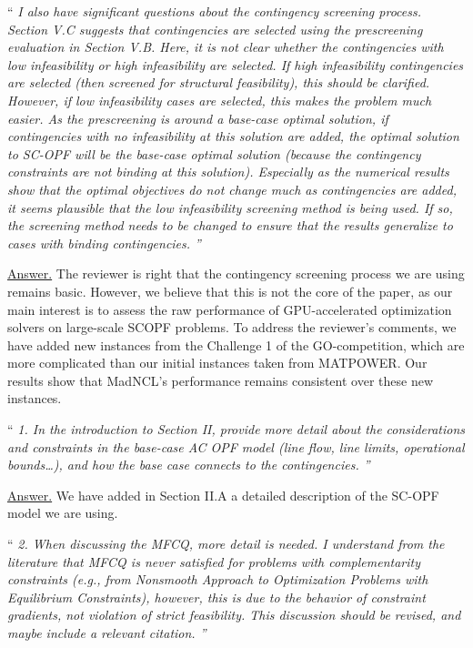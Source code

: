 \documentclass[10pt,a4paper]{article}
\newenvironment{quotereviewer}{\vspace{.5cm}{\underline\reviewername} ``\it\footnotesize}{''}
\newcommand{\answer}{\vspace{1mm}\underline{Answer.} }
\begin{document}
\begin{quotereviewer}
I also have significant questions about the contingency screening process. Section V.C suggests that contingencies are selected using the prescreening evaluation in Section V.B. Here, it is not clear whether the contingencies with low infeasibility or high infeasibility are selected. If high infeasibility contingencies are selected (then screened for structural feasibility), this should be clarified. However, if low infeasibility cases are selected, this makes the problem much easier. As the prescreening is around a base-case optimal solution, if contingencies with no infeasibility at this solution are added, the optimal solution to SC-OPF will be the base-case optimal solution (because the contingency constraints are not binding at this solution). Especially as the numerical results show that the optimal objectives do not change much as contingencies are added, it seems plausible that the low infeasibility screening method is being used. If so, the screening method needs to be changed to ensure that the results generalize to cases with binding contingencies.
\end{quotereviewer}

\answer
The reviewer is right that the contingency screening process we are using remains basic.
However, we believe that this is not the core of the paper, as our main interest is to assess
the raw performance of GPU-accelerated optimization solvers on large-scale SCOPF problems.
To address the reviewer's comments, we have added new instances from the Challenge 1 of
the GO-competition, which are more complicated than our initial instances taken from MATPOWER.
Our results show that MadNCL's performance remains consistent over these new instances.

\begin{quotereviewer}
1. In the introduction to Section II, provide more detail about the considerations and constraints in the base-case AC OPF model (line flow, line limits, operational bounds…), and how the base case connects to the contingencies.
\end{quotereviewer}

\answer
We have added in Section II.A a detailed description of the SC-OPF model we are using.

\begin{quotereviewer}
2. When discussing the MFCQ, more detail is needed. I understand from the literature that MFCQ is never satisfied for problems with complementarity constraints (e.g., from Nonsmooth Approach to Optimization Problems with Equilibrium Constraints), however, this is due to the behavior of constraint gradients, not violation of strict feasibility. This discussion should be revised, and maybe include a relevant citation.
\end{quotereviewer}
\end{document}
